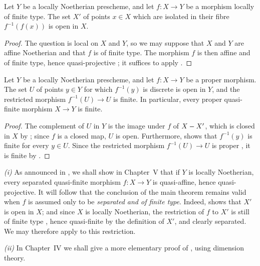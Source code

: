 \begin{proposition}[4.4.10]
\label{III.4.4.10}
Let $Y$ be a locally Noetherian prescheme, and let $f:X\to Y$ be a
morphism locally of finite type.  The set $X'$ of points $x\in X$
which are isolated in their fibre $f^{-1}(f(x))$ is open in $X$.
\end{proposition}

\begin{proof}
The question is local on $X$ and $Y$, so we may suppose that $X$ and
$Y$ are affine Noetherian and that $f$ is of finite type.  The
morphism $f$ is then affine and of finite type, hence quasi-projective
; it suffices to apply .
\end{proof}


\begin{corollary}[4.4.11]
\label{III.4.4.11}
Let $Y$ be a locally Noetherian prescheme, and let $f:X\to Y$ be a
proper morphism.  The set $U$ of points $y\in Y$ for which
$f^{-1}(y)$ is discrete is open in $Y$, and the restricted morphism
$f^{-1}(U)\to U$ is finite.  In particular, every proper
quasi-finite morphism $X\to Y$ is finite.
\end{corollary}

\begin{proof}
The complement of $U$ in $Y$ is the image under $f$ of $X- X'$, which
is closed in $X$ by ; since $f$ is a closed map,
$U$ is open.  Furthermore,  shows that
$f^{-1}(y)$ is finite for every $y\in U$.  Since the restricted
morphism $f^{-1}(U)\to U$ is proper , it is finite
by .
\end{proof}

\begin{remark}[4.4.12]
\label{III.4.4.12}
\emph{(i)}
As announced in , we shall show in Chapter~V that
if $Y$ is locally Noetherian, every separated quasi-finite morphism
$f:X\to Y$ is quasi-affine, hence quasi-projective.  It will follow
that the conclusion of the main theorem  remains
valid when $f$ is assumed only to be \emph{separated and of finite type}.
Indeed,  shows that $X'$ is open in $X$; and since
$X$ is locally Noetherian, the restriction of $f$ to $X'$ is still
of finite type , hence quasi-finite by the definition
of $X'$, and clearly separated.  We may therefore apply
 to this restriction.

\emph{(ii)}
In Chapter~IV we shall give a more elementary proof of
, using dimension theory.
\end{remark}



